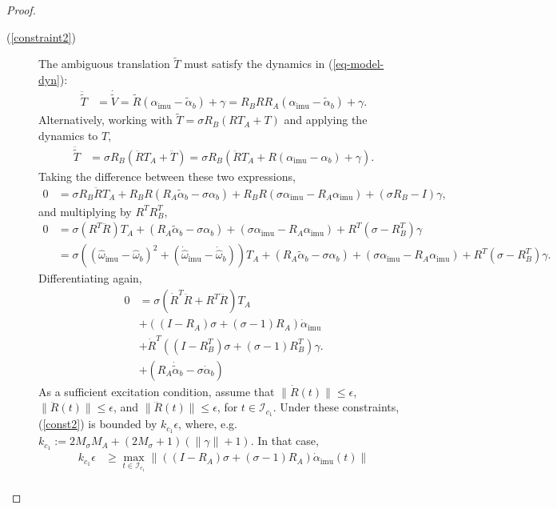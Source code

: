 \documentclass[]{article}
\def\w{\omega}
\def\hw{{\widehat\w}}
\def\imu{_\mathrm{imu}}
\def\I{\mathcal{I}}
\begin{document}
\begin{proof}
\begin{description}
\item[(\ref{constraint2})]
The ambiguous translation $\tilde T$ must satisfy the dynamics in (\ref{eq-model-dyn}):
\begin{align*}
\ddot{\tilde T} &= \dot{\tilde V}  = {\tilde R}(\alpha\imu - \tilde\alpha_b) + \gamma
= R_B R R_A(\alpha\imu - \tilde\alpha_b) + \gamma.
\end{align*}
Alternatively, working with $\tilde T = \sigma R_B(R T_A + T)$ and applying the dynamics to $T$,
\begin{align*}
\ddot{\tilde T} & = \sigma R_B(\ddot RT_A + \ddot T)
= \sigma R_B(\ddot RT_A + R (\alpha\imu - \alpha_b) + \gamma).
\end{align*}
Taking the difference between these two expressions,
\begin{align*}
0 &= \sigma R_B\ddot R T_A
  + R_BR(R_A\tilde\alpha_b - \sigma\alpha_b)
  + R_BR(\sigma\alpha\imu - R_A\alpha\imu)
  + (\sigma R_B - I)\gamma,
\end{align*}
and multiplying by $R^TR_B^T$,
\begin{align*}
0&= \sigma(R^T\ddot R)T_A
  + (R_A\tilde\alpha_b - \sigma\alpha_b)
  + (\sigma\alpha\imu - R_A\alpha\imu)
  + R^T(\sigma - R_B^T)\gamma\\
&= \sigma((\hw\imu-\hw_b)^2 + (\dot\hw\imu-\dot\hw_b))T_A
  + (R_A\tilde\alpha_b - \sigma\alpha_b)
  + (\sigma\alpha\imu - R_A\alpha\imu)
  + R^T(\sigma - R_B^T)\gamma.
\end{align*}
Differentiating again,
\begin{align}
0 &= \sigma(\dot R^T\ddot R + R^T\dddot R)T_A\label{const1}\\
  &+ ((I-R_A)\sigma + (\sigma-1)R_A)\dot\alpha\imu\label{const2}\\
  &+ \dot R^T((I-R_B^T)\sigma + (\sigma-1)R_B^T)\gamma.\label{const3}\\
  &+ (R_A\dot{\tilde\alpha}_b - \sigma\dot{\alpha}_b)\label{const4}
\end{align}
As a sufficient excitation condition, assume that
$\|\dot R(t)\|\leq\epsilon$, $\|\ddot R(t)\|\leq\epsilon$, and
$\|\dddot R(t)\|\leq\epsilon$, for 
$t\in\I_{c_1}$.
Under these constraints, (\ref{const2}) is
bounded by $k_{c_1}\epsilon$, where, e.g. $k_{c_1} := 2M_\sigma M_A + (2M_\sigma+1)(\|\gamma\|+1)$.
In that case,
\begin{align*}
k_{c_1}\epsilon &\geq \max_{t\in\I_{c_1}}\|((I-R_A)\sigma + (\sigma-1)R_A)\dot\alpha\imu(t)\|\\                                                                                        

\end{align*}
\end{description}
\end{proof}
\end{document}
